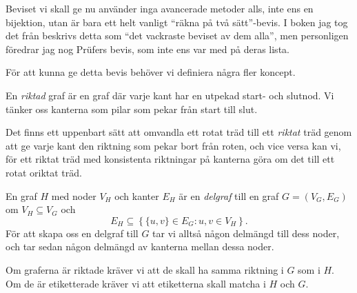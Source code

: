 \documentclass[nobib]{tufte-handout}
\begin{document}
Beviset vi skall ge nu använder inga avancerade metoder alls, inte ens en bijektion, utan är bara ett helt vanligt ``räkna på två sätt''-bevis. I boken jag tog det från
beskrivs detta som ``det vackraste beviset av dem alla'', men personligen föredrar jag nog Prüfers bevis, som inte ens var med på deras lista.

För att kunna ge detta bevis behöver vi definiera några fler koncept.

\begin{definition}
    En \emph{riktad} graf är en graf där varje kant har en utpekad start- och slutnod. Vi tänker oss kanterna som pilar som pekar från start till slut.

    Det finns ett uppenbart sätt att omvandla ett rotat träd till ett \emph{riktat} träd genom att ge varje kant den riktning som pekar bort från roten, och vice versa kan vi, för ett riktat träd med konsistenta riktningar på kanterna göra om det till ett rotat oriktat träd.
\end{definition}

\begin{definition}
    En graf $H$ med noder $V_H$ och kanter $E_H$ är en \emph{delgraf} till en graf $G = (V_G, E_G)$ om $V_H\subseteq V_G$ och 
    $$E_H \subseteq \left\{\{u,v\} \in E_G: u, v \in V_H\right\}.$$
    För att skapa oss en delgraf till $G$ tar vi alltså någon delmängd till dess noder, och tar sedan någon delmängd av kanterna mellan dessa noder.

    Om graferna är riktade kräver vi att de skall ha samma riktning i $G$ som i $H$. Om de är etiketterade kräver vi att etiketterna skall matcha i $H$ och $G$.
\end{definition}
\end{document}
